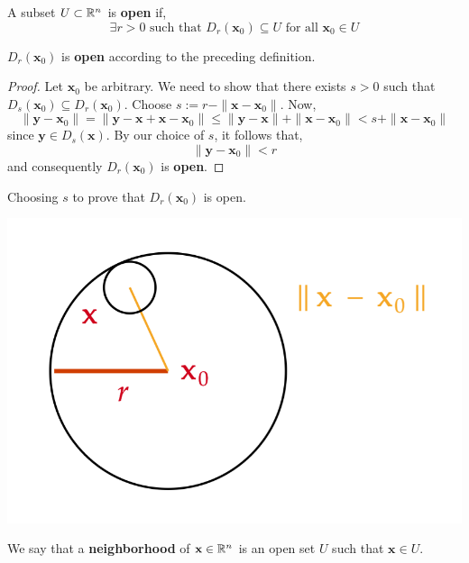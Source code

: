 \begin{defn}
     A subset $U \subset \mathbb{R}^n$ is \textbf{open} if,
     \[\exists r > 0 \text{ such that } D_r(\mathbf{x}_0) \subseteq U \text{ for all } \mathbf{x}_0 \in U\]
\end{defn}

\begin{prop}
    $D_r(\mathbf{x}_0)$ is \textbf{open} according to the preceding definition.
\end{prop}

\begin{proof}
    Let $\mathbf{x}_0$ be arbitrary. We need to show that there exists $s > 0$ such that $D_s(\mathbf{x}_0) \subseteq D_r(\mathbf{x}_0)$. Choose $s := r - \|\mathbf{x} - \mathbf{x}_0\|$. Now,
    \[\|\mathbf{y} - \mathbf{x}_0\| = \|\mathbf{y} - \mathbf{x} + \mathbf{x} - \mathbf{x}_0\| \leq \|\mathbf{y}-\mathbf{x}\|+\|\mathbf{x}-\mathbf{x}_0\| < s + \|\mathbf{x}-\mathbf{x}_0\|\]
    since $\mathbf{y} \in D_s(\mathbf{x})$. By our choice of $s$, it follows that,
    \[\|\mathbf{y} - \mathbf{x}_0\| < r\]
    and consequently $D_r(\mathbf{x}_0)$ is \textbf{open}.
\end{proof}

\begin{marginfigure}
    Choosing $s$ to prove that $D_r(\mathbf{x}_0)$ is open.
    \begin{center}
       \includegraphics[width=\textwidth]{figures/wk-1/fig-17.png}
    \end{center}
\end{marginfigure}

\begin{marginfigure}
    We say that a \textbf{neighborhood} of $\mathbf{x} \in \mathbb{R}^n$ is an open set $U$ such that $\mathbf{x} \in U$.
\end{marginfigure}

